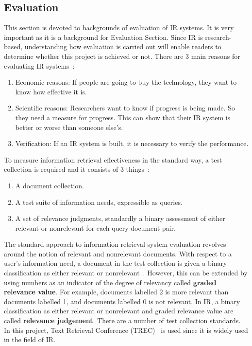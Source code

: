\subsection{Evaluation}\label{sec:evaluation}
This section is devoted to backgrounds of evaluation of IR systems. It is very important as it is a background for Evaluation Section. 
Since IR is research-based, understanding how evaluation is carried out will enable readers to determine whether 
this project is achieved or not. There are 3 main reasons for evaluating IR systems~\cite[P. 3]{eval}: 
\begin{enumerate}
 \item Economic reasons: If people are going to buy the technology, they want to know how effective it is.
 \item Scientific reasons: Researchers want to know if progress is being made. So they need a measure for progress. 
	This can show that their IR system is better or worse than someone else's.
 \item Verification: If an IR system is built, it is necessary to verify the performance.
\end{enumerate}

To measure information retrieval effectiveness in the standard way, a test collection is required and it consists of 3 things~\cite{evalweb}:
\begin{enumerate}
 \item A document collection.
 \item A test suite of information needs, expressible as queries.
 \item A set of relevance judgments, standardly a binary assessment of either relevant or nonrelevant for each query-document pair.
\end{enumerate}

The standard approach to information retrieval system evaluation revolves around the notion of relevant and nonrelevant documents. With respect 
to a user's information need, a document in the test collection is given a binary classification as either relevant or nonrelevant~\cite{evalweb}. However,
this can be extended by using numbers as an indicator of the degree of relevancy called \textbf{graded relevance value}. For example, documents labelled 2 is more relevant than documents
labelled 1, and documents labelled 0 is not relevant. In IR, a binary classification as either relevant or nonrelevant and graded relevance value are
called \textbf{relevance judgement}.
There are a number of test collection standards. In this project, Text Retrieval Conference (TREC)~\cite{trec}
is used since it is widely used in the field of IR.

